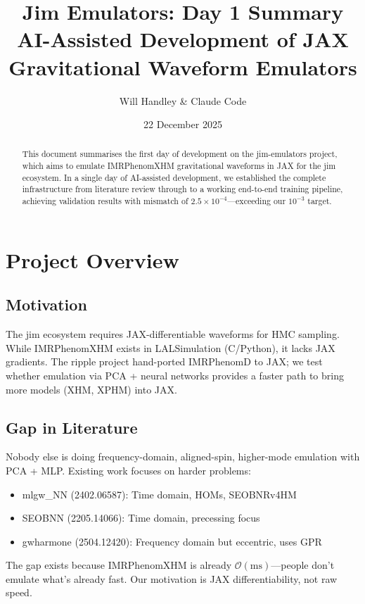 \documentclass[11pt,a4paper]{article}
\title{Jim Emulators: Day 1 Summary\\[0.3em]
\large AI-Assisted Development of JAX Gravitational Waveform Emulators}
\author{Will Handley \& Claude Code}
\date{22 December 2025}
\begin{document}
\maketitle

\begin{abstract}
This document summarises the first day of development on the jim-emulators project, which aims to emulate IMRPhenomXHM gravitational waveforms in JAX for the jim ecosystem. In a single day of AI-assisted development, we established the complete infrastructure from literature review through to a working end-to-end training pipeline, achieving validation results with mismatch of $2.5 \times 10^{-4}$---exceeding our $10^{-3}$ target.
\end{abstract}

\section{Project Overview}

\subsection{Motivation}

The jim ecosystem requires JAX-differentiable waveforms for HMC sampling. While IMRPhenomXHM exists in LALSimulation (C/Python), it lacks JAX gradients. The ripple project hand-ported IMRPhenomD to JAX; we test whether emulation via PCA + neural networks provides a faster path to bring more models (XHM, XPHM) into JAX.

\subsection{Gap in Literature}

Nobody else is doing frequency-domain, aligned-spin, higher-mode emulation with PCA + MLP. Existing work focuses on harder problems:
\begin{itemize}[noitemsep]
    \item mlgw\_NN (2402.06587): Time domain, HOMs, SEOBNRv4HM
    \item SEOBNN (2205.14066): Time domain, precessing focus
    \item gwharmone (2504.12420): Frequency domain but eccentric, uses GPR
\end{itemize}

The gap exists because IMRPhenomXHM is already $\mathcal{O}(\mathrm{ms})$---people don't emulate what's already fast. Our motivation is JAX differentiability, not raw speed.
\end{document}

